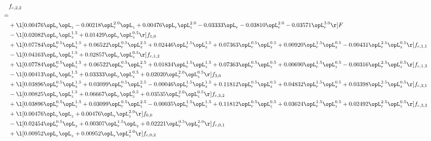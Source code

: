\begin{alignat}{2} 
\label{eq:f_22_1} 
& f_{c,2,2} \nonumber \\ 
 = \\ 
& + \l[  0.00476 \opL_r \opL_z   -0.00218 \opL_r^{2.0} \opL_z +  0.00476 \opL_r \opL_z^{2.0}   -0.03333 \opL_r   -0.03810 \opL_r^{2.0}   -0.03571 \opL_r^{3.0}  \r] F \nonumber \\ 
& - \l[  0.02082 \opL_r \opL_z^{1.5} +  0.01429 \opL_r \opL_z^{0.5}  \r] f_{1,0} \nonumber \\ 
& + \l[  0.07784 \opL_r^{0.5} \opL_z^{1.5} +  0.06522 \opL_r^{0.5} \opL_z^{2.5} +  0.02446 \opL_r^{1.5} \opL_z^{1.5} +  0.07363 \opL_r^{0.5} \opL_z^{0.5} +  0.00920 \opL_r^{1.5} \opL_z^{0.5}   -0.00431 \opL_r^{2.5} \opL_z^{0.5}  \r] f_{c,1,1} \nonumber \\ 
& - \l[  0.04163 \opL_r \opL_z^{1.5} +  0.02857 \opL_r \opL_z^{0.5}  \r] f_{c,1,2} \nonumber \\ 
& + \l[  0.07784 \opL_r^{0.5} \opL_z^{1.5} +  0.06522 \opL_r^{0.5} \opL_z^{2.5} +  0.01834 \opL_r^{1.5} \opL_z^{1.5} +  0.07363 \opL_r^{0.5} \opL_z^{0.5} +  0.00690 \opL_r^{1.5} \opL_z^{0.5}   -0.00316 \opL_r^{2.5} \opL_z^{0.5}  \r] f_{c,1,3} \nonumber \\ 
& - \l[  0.00413 \opL_r \opL_z^{1.5} +  0.03333 \opL_r \opL_z^{0.5} +  0.02020 \opL_r^{2.0} \opL_z^{0.5}  \r] f_{3,0} \nonumber \\ 
& + \l[  0.03896 \opL_r^{0.5} \opL_z^{1.5} +  0.03099 \opL_r^{0.5} \opL_z^{2.5}   -0.00046 \opL_r^{1.5} \opL_z^{1.5} +  0.11812 \opL_r^{0.5} \opL_z^{0.5} +  0.04832 \opL_r^{1.5} \opL_z^{0.5} +  0.03398 \opL_r^{2.5} \opL_z^{0.5}  \r] f_{c,3,1} \nonumber \\ 
& - \l[  0.00825 \opL_r \opL_z^{1.5} +  0.06667 \opL_r \opL_z^{0.5} +  0.03535 \opL_r^{2.0} \opL_z^{0.5}  \r] f_{c,3,2} \nonumber \\ 
& + \l[  0.03896 \opL_r^{0.5} \opL_z^{1.5} +  0.03099 \opL_r^{0.5} \opL_z^{2.5}   -0.00035 \opL_r^{1.5} \opL_z^{1.5} +  0.11812 \opL_r^{0.5} \opL_z^{0.5} +  0.03624 \opL_r^{1.5} \opL_z^{0.5} +  0.02492 \opL_r^{2.5} \opL_z^{0.5}  \r] f_{c,3,3} \nonumber \\ 
& + \l[  0.00476 \opL_r \opL_z +  0.00476 \opL_r \opL_z^{2.0}  \r] f_{0,0} \nonumber \\ 
& - \l[  0.02454 \opL_r^{0.5} \opL_z +  0.00307 \opL_r^{1.5} \opL_z +  0.02221 \opL_r^{0.5} \opL_z^{2.0}  \r] f_{c,0,1} \nonumber \\ 
& + \l[  0.00952 \opL_r \opL_z +  0.00952 \opL_r \opL_z^{2.0}  \r] f_{c,0,2} \nonumber \\ 

\end{alignat}
